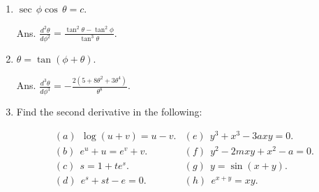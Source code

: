 \begin{enumerate}
\item
$\sec\,\phi\cos\,\theta = c$. 	 	

Ans.
$\frac{d^2 \theta}{d\phi^2} = \frac{\tan^2 \theta - \tan^2 \phi}{\tan^3 \theta}$.

\item
$\theta=\tan(\phi + \theta)$. 	

Ans.
$\frac{d^3 \theta}{d\phi^3} = -\frac{2(5 + 8\theta^2 + 3\theta^4)}{\theta^8}$.

\item
Find the second derivative in the following:

\[
\begin{array}{ll}
(a)\ \  \log(u + v) = u - v. &	(e)\ \  y^3 + x^3 - 3axy = 0.\\
(b)\ \  e^u + u = e^v + v.  &	(f)\ \  y^2 - 2mxy + x^2 - a = 0.\\
(c)\ \  s = 1 + te^s.  &	(g)\ \  y = \sin(x + y).\\
(d)\ \  e^s + st - e = 0.  &	(h)\ \  e^{x + y} = xy.\\
\end{array}
\]

\end{enumerate}


